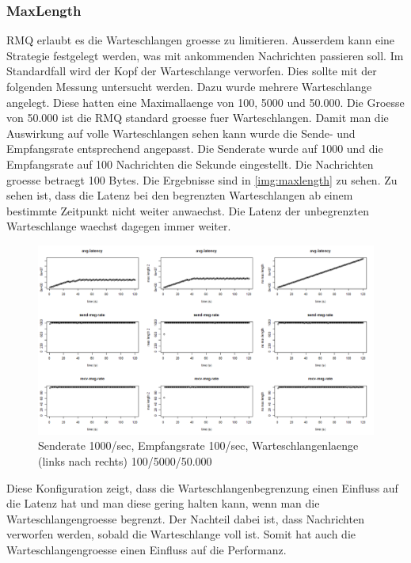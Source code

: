 \subsubsection{MaxLength}
\label{subsub:maxlength}
RMQ erlaubt es die Warteschlangen groesse zu limitieren. Ausserdem kann eine Strategie festgelegt werden, was mit ankommenden Nachrichten passieren soll. Im Standardfall wird der Kopf der Warteschlange verworfen. Dies sollte mit der folgenden Messung untersucht werden. Dazu wurde mehrere Warteschlange angelegt. Diese hatten eine Maximallaenge von 100, 5000 und 50.000. Die Groesse von 50.000 ist die RMQ standard groesse fuer Warteschlangen. Damit man die Auswirkung auf volle Warteschlangen sehen kann wurde die Sende- und Empfangsrate entsprechend angepasst. Die Senderate wurde auf 1000 und die Empfangsrate auf 100 Nachrichten die Sekunde eingestellt. Die Nachrichten groesse betraegt 100 Bytes.
Die Ergebnisse sind in \autoref{img:maxlength} zu sehen. Zu sehen ist, dass die Latenz bei den begrenzten Warteschlangen ab einem bestimmte Zeitpunkt nicht weiter anwaechst. Die Latenz der unbegrenzten Warteschlange waechst dagegen immer weiter.
\begin{figure}
\center
  \includegraphics[width=1\textwidth]{images/max-length.png}
  \caption{Senderate 1000/sec, Empfangsrate 100/sec, Warteschlangenlaenge (links nach rechts) 100/5000/50.000}
  \label{img:maxlength}
\end{figure}
Diese Konfiguration zeigt, dass die Warteschlangenbegrenzung einen Einfluss auf die Latenz hat und man diese gering halten kann, wenn man die Warteschlangengroesse begrenzt. Der Nachteil dabei ist, dass Nachrichten verworfen werden, sobald die Warteschlange voll ist. Somit hat auch die Warteschlangengroesse einen Einfluss auf die Performanz. 


